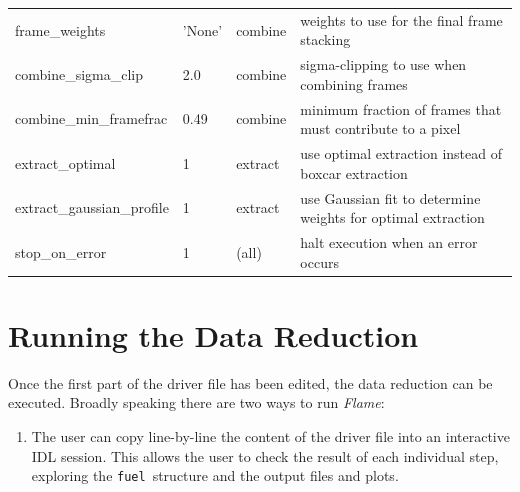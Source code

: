 \documentclass[a4paper]{article}
\newcommand{\flame}{\emph{Flame}}
\newcommand{\fuel}{\texttt{fuel}}
\begin{document}
\begin{sloppypar}
\begin{table}
{\begin{tabular}{llll}
    frame\_weights                & 'None'        & combine          & weights to use for the final frame stacking \\
    combine\_sigma\_clip          & 2.0           & combine          & sigma-clipping to use when combining frames \\
    combine\_min\_framefrac       & 0.49          & combine          & minimum fraction of frames that must contribute to a pixel \\
    extract\_optimal              & 1             & extract          & use optimal extraction instead of boxcar extraction \\
    extract\_gaussian\_profile    & 1             & extract          & use Gaussian fit to determine weights for optimal extraction \\
    stop\_on\_error               & 1             & (all)            & halt execution when an error occurs \\
    \hline
  \end{tabular}
  }
\end{table}







\section{Running the Data Reduction}
\label{sec:data_reduction}

Once the first part of the driver file has been edited, the data reduction can be executed. Broadly speaking there are two ways to run \flame:
\begin{enumerate}
\item The user can copy line-by-line the content of the driver file into an interactive IDL session. This allows the user to check the result of each individual step, exploring the \fuel\ structure and the output files and plots.


\end{enumerate}
\end{sloppypar}
\end{document}
